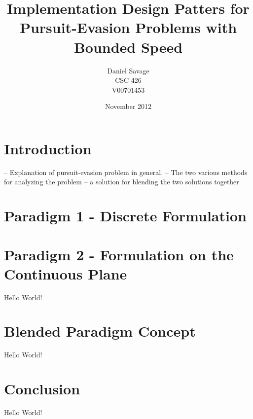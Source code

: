\documentclass{article}
\begin{document}
\title{Implementation Design Patters for Pursuit-Evasion Problems with Bounded Speed}
\author{Daniel Savage\\CSC 426\\{V00701453}}
\date{November 2012}
\maketitle
\pagebreak

\section{Introduction}
-- Explanation of pursuit-evasion problem in general.
-- The two various methods for analyzing the problem
-- a solution for blending the two solutions together

\section{Paradigm 1 - Discrete Formulation}


\section{Paradigm 2 - Formulation on the Continuous Plane}
Hello World!

\section{Blended Paradigm Concept}
Hello World!

\section{Conclusion}
Hello World!
\end{document}

